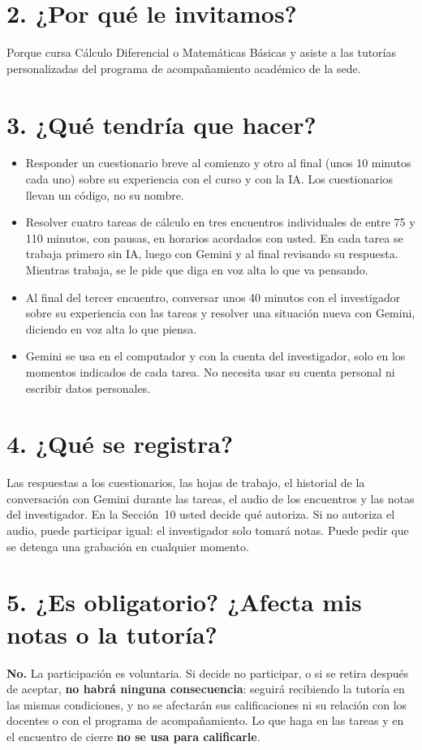 \documentclass[11pt,letterpaper]{article}
\begin{document}
\section*{2. ¿Por qué le invitamos?}
Porque cursa Cálculo Diferencial o Matemáticas Básicas y asiste a las tutorías personalizadas del programa de acompañamiento académico de la sede.

\section*{3. ¿Qué tendría que hacer?}
\begin{itemize}
  \item Responder un cuestionario breve al comienzo y otro al final (unos 10 minutos cada uno) sobre su experiencia con el curso y con la IA. Los cuestionarios llevan un código, no su nombre.
  \item Resolver cuatro tareas de cálculo en tres encuentros individuales de entre 75 y 110 minutos, con pausas, en horarios acordados con usted. En cada tarea se trabaja primero sin IA, luego con Gemini y al final revisando su respuesta. Mientras trabaja, se le pide que diga en voz alta lo que va pensando.
  \item Al final del tercer encuentro, conversar unos 40 minutos con el investigador sobre su experiencia con las tareas y resolver una situación nueva con Gemini, diciendo en voz alta lo que piensa.
  \item Gemini se usa en el computador y con la cuenta del investigador, solo en los momentos indicados de cada tarea. No necesita usar su cuenta personal ni escribir datos personales.
\end{itemize}

\section*{4. ¿Qué se registra?}
Las respuestas a los cuestionarios, las hojas de trabajo, el historial de la conversación con Gemini durante las tareas, el audio de los encuentros y las notas del investigador. En la Sección~10 usted decide qué autoriza. Si no autoriza el audio, puede participar igual: el investigador solo tomará notas. Puede pedir que se detenga una grabación en cualquier momento.

\section*{5. ¿Es obligatorio? ¿Afecta mis notas o la tutoría?}
\textbf{No.} La participación es voluntaria. Si decide no participar, o si se retira después de aceptar, \textbf{no habrá ninguna consecuencia}: seguirá recibiendo la tutoría en las mismas condiciones, y no se afectarán sus calificaciones ni su relación con los docentes o con el programa de acompañamiento. Lo que haga en las tareas y en el encuentro de cierre \textbf{no se usa para calificarle}.
\end{document}
